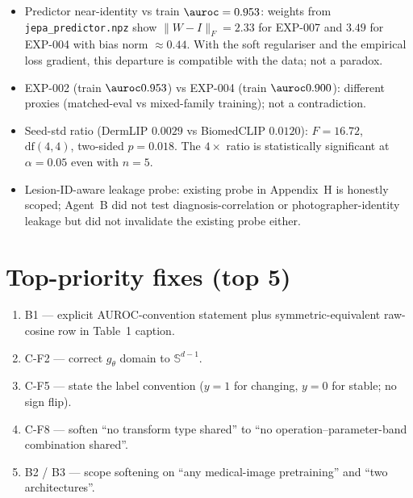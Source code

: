 \documentclass[11pt,a4paper]{article}
\begin{document}
\begin{itemize}[leftmargin=2em]
\item Predictor near-identity vs train $\auroc = 0.953$: weights from
      \texttt{jepa\_predictor.npz} show $\|W - I\|_F = 2.33$ for
      EXP-007 and $3.49$ for EXP-004 with bias norm $\approx 0.44$.
      With the soft regulariser and the empirical loss gradient, this
      departure is compatible with the data; not a paradox.
\item EXP-002 (train $\auroc 0.953$) vs EXP-004 (train $\auroc 0.900$):
      different proxies (matched-eval vs mixed-family training); not a
      contradiction.
\item Seed-std ratio (DermLIP $0.0029$ vs BiomedCLIP $0.0120$):
      $F = 16.72$, $\mathrm{df}(4,4)$, two-sided $p = 0.018$. The
      $4\times$ ratio is statistically significant at $\alpha = 0.05$
      even with $n = 5$.
\item Lesion-ID-aware leakage probe: existing probe in Appendix~H is
      honestly scoped; Agent~B did not test diagnosis-correlation or
      photographer-identity leakage but did not invalidate the existing
      probe either.
\end{itemize}

\section{Top-priority fixes (top 5)}

\begin{enumerate}[leftmargin=2em]
\item B1 --- explicit AUROC-convention statement plus symmetric-equivalent
      raw-cosine row in Table~1 caption.
\item C-F2 --- correct $g_\theta$ domain to $\mathbb{S}^{d-1}$.
\item C-F5 --- state the label convention ($y = 1$ for changing,
      $y = 0$ for stable; no sign flip).
\item C-F8 --- soften ``no transform type shared'' to
      ``no operation--parameter-band combination shared''.
\item B2 / B3 --- scope softening on ``any medical-image pretraining''
      and ``two architectures''.
\end{enumerate}
\end{document}
